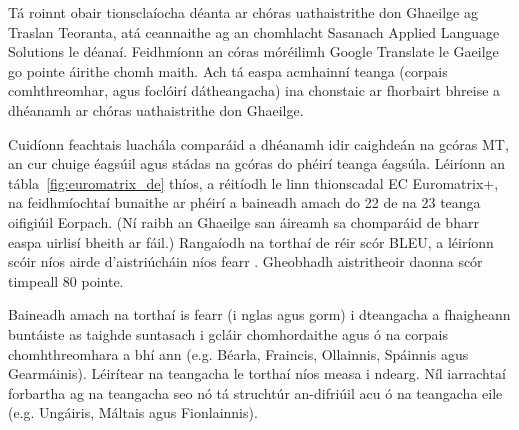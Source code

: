 \begin{multicols}{2}
Tá roinnt obair tionsclaíocha déanta ar chóras uathaistrithe don Ghaeilge ag Traslan Teoranta, atá ceannaithe ag an chomhlacht Sasanach Applied Language Solutions le déanaí. Feidhmíonn an córas móréilimh Google Translate le Gaeilge go pointe áirithe chomh maith. Ach tá easpa acmhainní teanga (corpais comhthreomhar, agus foclóirí dátheangacha) ina chonstaic ar fhorbairt bhreise a dhéanamh ar chóras uathaistrithe don Ghaeilge.

Cuidíonn feachtais luachála comparáid a dhéanamh idir caighdeán na gcóras MT, an cur chuige éagsúil agus stádas na gcóras do phéirí teanga éagsúla. Léiríonn an tábla~\ref{fig:euromatrix_de} thíos, a réitíodh le linn thionscadal EC Euromatrix+, na feidhmíochtaí bunaithe ar phéirí a baineadh amach do 22 de na 23 teanga oifigiúil Eorpach. (Ní raibh an Ghaeilge san áireamh sa chomparáid de bharr easpa uirlisí bheith ar fáil.) Rangaíodh na torthaí de réir scór BLEU, a léiríonn scóir níos airde d’aistriúcháin níos fearr \cite{bleu1}. Gheobhadh aistritheoir daonna scór timpeall 80 pointe.

Baineadh amach na torthaí is fearr (i nglas agus gorm) i dteangacha a fhaigheann buntáiste as taighde suntasach i gcláir chomhordaithe agus ó na corpais chomhthreomhara a bhí ann (e.g. Béarla, Fraincis, Ollainnis, Spáinnis agus Gearmáinis). Léirítear na teangacha le torthaí níos measa i ndearg. Níl iarrachtaí forbartha ag na teangacha seo nó tá struchtúr an-difriúil acu ó na teangacha eile (e.g. Ungáiris, Máltais agus Fionlainnis).


\end{multicols}
